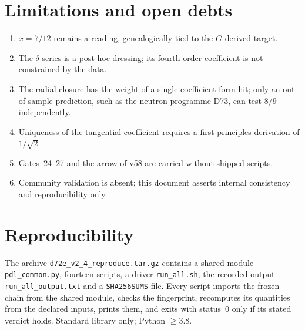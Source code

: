 \documentclass[11pt,a4paper]{article}
\begin{document}
\section{Limitations and open debts}
\begin{enumerate}[leftmargin=1.6em,itemsep=1pt]
\item $x = 7/12$ remains a reading, genealogically tied to the $G$-derived target.
\item The $\delta$ series is a post-hoc dressing; its fourth-order coefficient is not constrained by the data.
\item The radial closure has the weight of a single-coefficient form-hit; only an out-of-sample prediction, such as the neutron programme D73, can test $8/9$ independently.
\item Uniqueness of the tangential coefficient requires a first-principles derivation of $1/\sqrt2$.
\item Gates~24--27 and the arrow of v58 are carried without shipped scripts.
\item Community validation is absent; this document asserts internal consistency and reproducibility only.
\end{enumerate}

\section{Reproducibility}
The archive \texttt{d72e\_v2\_4\_reproduce.tar.gz} contains a shared module \texttt{pdl\_common.py}, fourteen scripts, a driver \texttt{run\_all.sh}, the recorded output \texttt{run\_all\_output.txt} and a \texttt{SHA256SUMS} file. Every script imports the frozen chain from the shared module, checks the fingerprint, recomputes its quantities from the declared inputs, prints them, and exits with status~0 only if its stated verdict holds. Standard library only; Python $\geq 3.8$.
\end{document}
